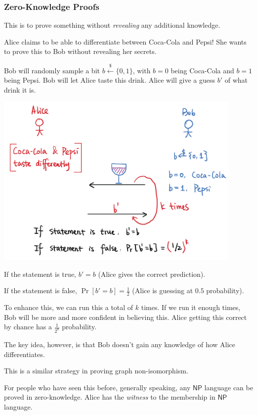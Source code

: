 \subsubsection{Zero-Knowledge Proofs}
This is to prove something without \emph{revealing} any additional knowledge.
\begin{example*}
    Alice claims to be able to differentiate between Coca-Cola and Pepsi! She wants to prove this to Bob without revealing her secrets.

    Bob will randomly sample a bit $b\overset{\$}{\leftarrow}\{0, 1\}$, with $b=0$ being Coca-Cola and $b=1$ being Pepsi. Bob will let Alice taste this drink. Alice will give a guess $b'$ of what drink it is.

    \begin{center}
        \includegraphics[width=0.9\textwidth]{images/2023-01-26/zk_cola.png}
    \end{center}

    If the statement is true, $b' = b$ (Alice gives the correct prediction).

    If the statement is false, $\Pr[b' = b] = \frac{1}{2}$ (Alice is guessing at $0.5$ probability).

    To enhance this, we can run this a total of $k$ times. If we run it enough times, Bob will be more and more confident in believing this. Alice getting this correct by chance has a $\frac{1}{2^k}$ probability.

    The key idea, however, is that Bob doesn't gain any knowledge of how Alice differentiates.

    \begin{remark*}
        This is a similar strategy in proving graph non-isomorphism.

        For people who have seen this before, generally speaking, any $\textsf{NP}$ language can be proved in zero-knowledge. Alice has the \emph{witness} to the membership in $\textsf{NP}$ language.
    \end{remark*}
\end{example*}


